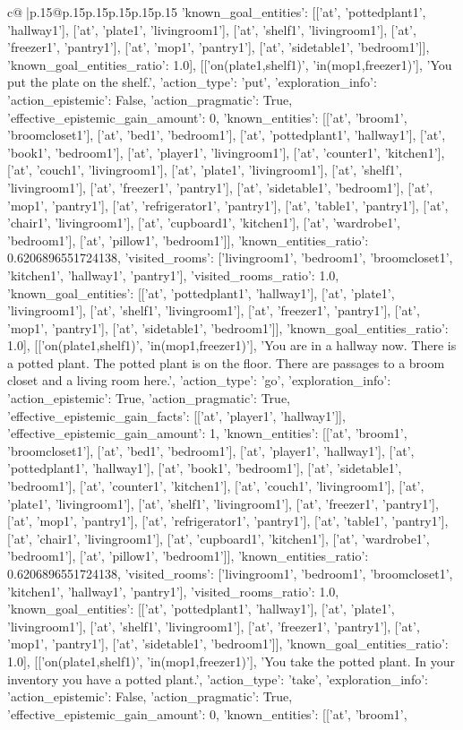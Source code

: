 \documentclass{article}
\begin{document}
{\begin{supertabular}{c@{$\;$}|p{.15\linewidth}@{}p{.15\linewidth}p{.15\linewidth}p{.15\linewidth}p{.15\linewidth}p{.15\linewidth}}
{{{'known_goal_entities': [['at', 'pottedplant1', 'hallway1'], ['at', 'plate1', 'livingroom1'], ['at', 'shelf1', 'livingroom1'], ['at', 'freezer1', 'pantry1'], ['at', 'mop1', 'pantry1'], ['at', 'sidetable1', 'bedroom1']], 'known_goal_entities_ratio': 1.0}}], [['on(plate1,shelf1)', 'in(mop1,freezer1)'], 'You put the plate on the shelf.', {'action_type': 'put', 'exploration_info': {'action_epistemic': False, 'action_pragmatic': True, 'effective_epistemic_gain_amount': 0, 'known_entities': [['at', 'broom1', 'broomcloset1'], ['at', 'bed1', 'bedroom1'], ['at', 'pottedplant1', 'hallway1'], ['at', 'book1', 'bedroom1'], ['at', 'player1', 'livingroom1'], ['at', 'counter1', 'kitchen1'], ['at', 'couch1', 'livingroom1'], ['at', 'plate1', 'livingroom1'], ['at', 'shelf1', 'livingroom1'], ['at', 'freezer1', 'pantry1'], ['at', 'sidetable1', 'bedroom1'], ['at', 'mop1', 'pantry1'], ['at', 'refrigerator1', 'pantry1'], ['at', 'table1', 'pantry1'], ['at', 'chair1', 'livingroom1'], ['at', 'cupboard1', 'kitchen1'], ['at', 'wardrobe1', 'bedroom1'], ['at', 'pillow1', 'bedroom1']], 'known_entities_ratio': 0.6206896551724138, 'visited_rooms': ['livingroom1', 'bedroom1', 'broomcloset1', 'kitchen1', 'hallway1', 'pantry1'], 'visited_rooms_ratio': 1.0, 'known_goal_entities': [['at', 'pottedplant1', 'hallway1'], ['at', 'plate1', 'livingroom1'], ['at', 'shelf1', 'livingroom1'], ['at', 'freezer1', 'pantry1'], ['at', 'mop1', 'pantry1'], ['at', 'sidetable1', 'bedroom1']], 'known_goal_entities_ratio': 1.0}}], [['on(plate1,shelf1)', 'in(mop1,freezer1)'], 'You are in a hallway now. There is a potted plant. The potted plant is on the floor. There are passages to a broom closet and a living room here.', {'action_type': 'go', 'exploration_info': {'action_epistemic': True, 'action_pragmatic': True, 'effective_epistemic_gain_facts': [['at', 'player1', 'hallway1']], 'effective_epistemic_gain_amount': 1, 'known_entities': [['at', 'broom1', 'broomcloset1'], ['at', 'bed1', 'bedroom1'], ['at', 'player1', 'hallway1'], ['at', 'pottedplant1', 'hallway1'], ['at', 'book1', 'bedroom1'], ['at', 'sidetable1', 'bedroom1'], ['at', 'counter1', 'kitchen1'], ['at', 'couch1', 'livingroom1'], ['at', 'plate1', 'livingroom1'], ['at', 'shelf1', 'livingroom1'], ['at', 'freezer1', 'pantry1'], ['at', 'mop1', 'pantry1'], ['at', 'refrigerator1', 'pantry1'], ['at', 'table1', 'pantry1'], ['at', 'chair1', 'livingroom1'], ['at', 'cupboard1', 'kitchen1'], ['at', 'wardrobe1', 'bedroom1'], ['at', 'pillow1', 'bedroom1']], 'known_entities_ratio': 0.6206896551724138, 'visited_rooms': ['livingroom1', 'bedroom1', 'broomcloset1', 'kitchen1', 'hallway1', 'pantry1'], 'visited_rooms_ratio': 1.0, 'known_goal_entities': [['at', 'pottedplant1', 'hallway1'], ['at', 'plate1', 'livingroom1'], ['at', 'shelf1', 'livingroom1'], ['at', 'freezer1', 'pantry1'], ['at', 'mop1', 'pantry1'], ['at', 'sidetable1', 'bedroom1']], 'known_goal_entities_ratio': 1.0}}], [['on(plate1,shelf1)', 'in(mop1,freezer1)'], 'You take the potted plant. In your inventory you have a potted plant.', {'action_type': 'take', 'exploration_info': {'action_epistemic': False, 'action_pragmatic': True, 'effective_epistemic_gain_amount': 0, 'known_entities': [['at', 'broom1', }}}
\end{supertabular}}
\end{document}
